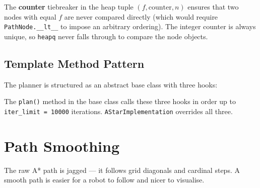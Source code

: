 \documentclass[12pt,a4paper]{article}
\begin{document}
\begin{tcolorbox}[notebox]
  The \textbf{counter} tiebreaker in the heap tuple
  $(f, \text{counter}, n)$ ensures that two nodes with equal $f$ are
  never compared directly (which would require \texttt{PathNode.\_\_lt\_\_}
  to impose an arbitrary ordering). The integer counter is always unique,
  so \texttt{heapq} never falls through to compare the node objects.
\end{tcolorbox}

\subsection{Template Method Pattern}

The planner is structured as an abstract base class with three hooks:

\begin{center}
\end{center}

The \texttt{plan()} method in the base class calls these three hooks in order
up to \texttt{iter\_limit = 10000} iterations.
\texttt{AStarImplementation} overrides all three.

\section{Path Smoothing}

The raw A* path is jagged --- it follows grid diagonals and cardinal steps.
A smooth path is easier for a robot to follow and nicer to visualise.
\end{document}
